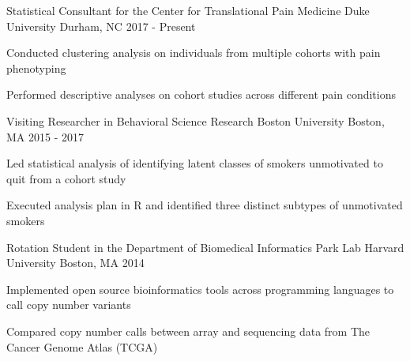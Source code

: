 

\begin{cventries}

  \cventry
    {Statistical Consultant for the Center for Translational Pain Medicine} %
    {Duke University} %
    {Durham, NC} %
    {2017 - Present} %
    {
      \begin{cvitems} %
        \item {Conducted clustering analysis on individuals from multiple cohorts with pain phenotyping}
        \item {Performed descriptive analyses on cohort studies across different pain conditions}
      \end{cvitems}
    }

  \cventry
    {Visiting Researcher in Behavioral Science Research} %
    {Boston University} %
    {Boston, MA} %
    {2015 - 2017} %
    {
      \begin{cvitems} %
        \item {Led statistical analysis of identifying latent classes of smokers unmotivated to quit from a cohort study}
        \item {Executed analysis plan in R and identified three distinct subtypes of unmotivated smokers}
      \end{cvitems}
    }

  \cventry
    {Rotation Student in the Department of Biomedical Informatics Park Lab} %
    {Harvard University} %
    {Boston, MA} %
    {2014} %
    {
      \begin{cvitems} %
        \item {Implemented open source bioinformatics tools across programming languages to call copy number variants}
        \item {Compared copy number calls between array and sequencing data from The Cancer Genome Atlas (TCGA)}
      \end{cvitems}
    }


\end{cventries}
